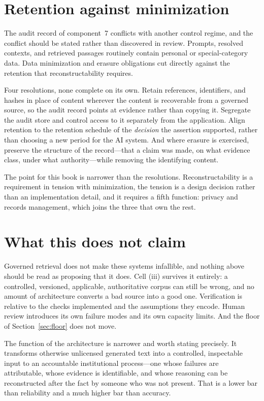 \section{Retention against minimization}
\label{sec:retention}

The audit record of component~7 conflicts with another control regime, and the
conflict should be stated rather than discovered in review. Prompts, resolved contexts,
and retrieved passages routinely contain personal or special-category data. Data
minimization and erasure obligations cut directly against the retention that
reconstructability requires.

Four resolutions, none complete on its own. Retain references, identifiers, and hashes
in place of content wherever the content is recoverable from a governed source, so the
audit record points at evidence rather than copying it. Segregate the audit store and
control access to it separately from the application. Align retention to the retention
schedule of the \emph{decision} the assertion supported, rather than choosing a new
period for the AI system. And where erasure is exercised, preserve the structure of the
record---that a claim was made, on what evidence class, under what authority---while
removing the identifying content.

The point for this book is narrower than the resolutions. Reconstructability is a
requirement in tension with minimization, the tension is a design decision rather than
an implementation detail, and it requires a fifth function: privacy and records
management, which joins the three that own the rest.

\section{What this does not claim}

Governed retrieval does not make these systems infallible, and nothing above should
be read as proposing that it does. Cell (iii) survives it entirely: a controlled,
versioned, applicable, authoritative corpus can still be wrong, and no amount of
architecture converts a bad source into a good one. Verification is relative to the
checks implemented and the assumptions they encode. Human review introduces its own
failure modes and its own capacity limits. And the floor of
Section~\ref{sec:floor} does not move.

The function of the architecture is narrower and worth stating precisely. It
transforms otherwise unlicensed generated text into a controlled, inspectable input
to an accountable institutional process---one whose failures are attributable,
whose evidence is identifiable, and whose reasoning can be reconstructed after the
fact by someone who was not present. That is a lower bar than reliability and a
much higher bar than accuracy.

